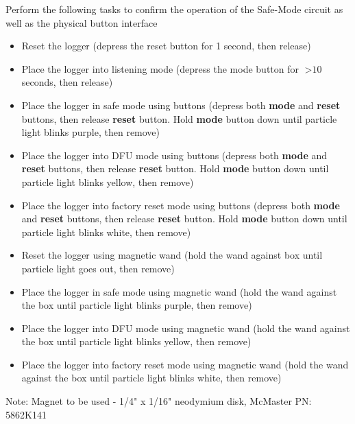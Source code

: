 Perform the following tasks to confirm the operation of the Safe-Mode circuit as well as the physical button interface 
\begin{itemize}
\item Reset the logger (depress the reset button for 1 second, then release)
\item Place the logger into listening mode (depress the mode button for $>\text{10}$ seconds, then release)
\item Place the logger in safe mode using buttons (depress both \textbf{mode} and \textbf{reset} buttons, then release \textbf{reset} button. Hold \textbf{mode} button down until particle light blinks purple, then remove)
\item Place the logger into DFU mode using buttons (depress both \textbf{mode} and \textbf{reset} buttons, then release \textbf{reset} button. Hold \textbf{mode} button down until particle light blinks yellow, then remove)
\item Place the logger into factory reset mode using buttons (depress both \textbf{mode} and \textbf{reset} buttons, then release \textbf{reset} button. Hold \textbf{mode} button down until particle light blinks white, then remove)
\item Reset the logger using magnetic wand (hold the wand against box until particle light goes out, then remove)
\item Place the logger in safe mode using magnetic wand (hold the wand against the box until particle light blinks purple, then remove)
\item Place the logger into DFU mode using magnetic wand (hold the wand against the box until particle light blinks yellow, then remove)
\item Place the logger into factory reset mode using magnetic wand (hold the wand against the box until particle light blinks white, then remove)
\end{itemize}

Note: Magnet to be used - 1/4" x 1/16" neodymium disk, McMaster PN: 5862K141

